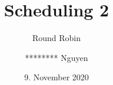 \usepackage[utf8]{inputenc}
\usepackage[T1]{fontenc}

\usepackage[ngerman]{babel}
\usepackage{adjustbox}
\usepackage{appendixnumberbeamer}

\usepackage{xcolor}

\usepackage[backend=biber,sorting=none]{biblatex}






\title{Scheduling 2}
\subtitle{Round Robin}
\author{******** Nguyen}
\date{9. November 2020}
